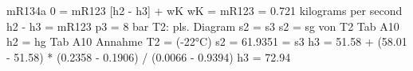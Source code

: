 mR134a  
0 = mR123 [h2 - h3] + wK  
wK = mR123 = 0.721 kilograms per second  
h2 - h3 = mR123  
p3 = 8 bar  
T2: pls. Diagram  
s2 = s3  
s2 = sg von T2 Tab A10  
h2 = hg Tab A10  
Annahme  
T2 = (-22°C)  
s2 = 61.9351 = s3  
h3 = 51.58 + (58.01 - 51.58) * (0.2358 - 0.1906) / (0.0066 - 0.9394)  
h3 = 72.94